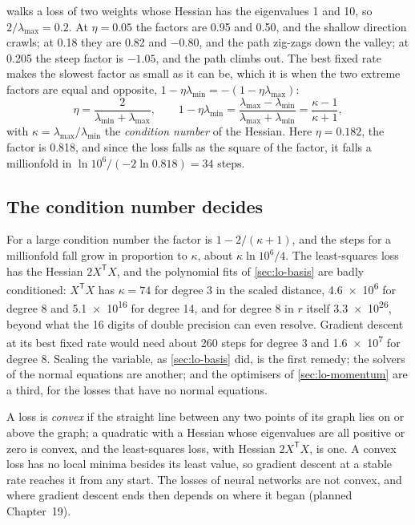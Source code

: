 walks a loss of two weights whose Hessian has the
eigenvalues 1 and 10, so $2/\lambda_{\max} = 0.2$. At $\eta = 0.05$ the
factors are 0.95 and 0.50, and the shallow direction crawls; at 0.18 they
are 0.82 and $-0.80$, and the path zig-zags down the valley; at 0.205
the steep factor is $-1.05$, and the path climbs out. The best fixed rate
makes the slowest factor as small as it can be, which it is when the
two extreme factors are equal and opposite, $1 - \eta\lambda_{\min} =
-(1 - \eta\lambda_{\max})$:
\begin{equation*}
   \eta = \frac{2}{\lambda_{\min} + \lambda_{\max}} , \qquad
   1 - \eta\lambda_{\min} = \frac{\lambda_{\max} - \lambda_{\min}}
   {\lambda_{\max} + \lambda_{\min}} = \frac{\kappa - 1}{\kappa + 1} ,
\end{equation*}
with $\kappa = \lambda_{\max}/\lambda_{\min}$ the \emph{condition number}
of the Hessian. Here $\eta = 0.182$, the factor is 0.818, and since the
loss falls as the square of the factor, it falls a millionfold in
$\ln10^6/(-2\ln0.818) = 34$ steps.

\subsection*{The condition number decides}

For a large condition number the factor is $1 - 2/(\kappa + 1)$, and the
steps for a millionfold fall grow in proportion to $\kappa$, about
$\kappa\ln10^6/4$. The least-squares loss has the Hessian $2X^{\mathsf
T}X$, and the polynomial fits of \cref{sec:lo-basis} are badly
conditioned: $X^{\mathsf T}X$ has $\kappa = 74$ for degree 3 in the scaled
distance, \num{4.6e6} for degree 8 and \num{5.1e16} for degree 14, and
for degree 8 in $r$ itself \num{3.3e26}, beyond what the 16 digits of
double precision can even resolve. Gradient descent at its best fixed rate
would need about 260 steps for degree 3 and \num{1.6e7} for degree 8.
Scaling the variable, as \cref{sec:lo-basis} did, is the first remedy;
the solvers of the normal equations are another; and the optimisers of
\cref{sec:lo-momentum} are a third, for the losses that have no normal
equations.

A loss is \emph{convex} if the straight line between any two points of
its graph lies on or above the graph; a quadratic with a Hessian whose
eigenvalues are all positive or zero is convex, and the least-squares
loss, with Hessian $2X^{\mathsf T}X$, is one. A convex loss has no local
minima besides its least value, so gradient descent at a stable rate
reaches it from any start. The losses of neural networks are not convex,
and where gradient descent ends then depends on where it began
(planned Chapter~19).

